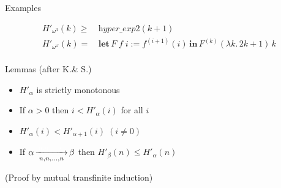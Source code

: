 \documentclass[10pt, fleqn]{beamer}
\begin{document}
\begin{frame}[fragile]
  \begin{block}{Examples}
         
      {\color{mathcolor}
      
    \begin{align*}
      H'_{\omega^3}(k) \geq\, & \textit{hyper\_exp2}(k+1) \\
      H'_{\omega^\omega}(k)=\,& \textbf{let}\,F\;f\;i := f^{(i+1)}(i)\,
                      \textbf{in}\, F^{(k)}(\lambda k.\,2k+1)\,k\\
    \end{align*}
       }%
  \end{block}
  

\begin{block}{Lemmas (after K.\& S.)}
   \begin{itemize} 
    \item \textcolor{mathcolor}{$H'_\alpha$} is strictly monotonous
    
     \item  If $\alpha>0$ then \textcolor{mathcolor}{$ i < H'_\alpha(i)$} for all $i$
    
    \item   $H'_\alpha(i) < H'_{\alpha+1}(i) \; (i \not=0)$
    
       \item     If \textcolor{mathcolor}{$\alpha \rplus{n,n,\dots,n} \beta$} then \textcolor{mathcolor}{$H'_\beta(n)\leq H'_\alpha(n)$} 
         

       \end{itemize}
       (Proof by mutual transfinite induction)
 \end{block}  
  
    
\end{frame}
 



\end{document}
